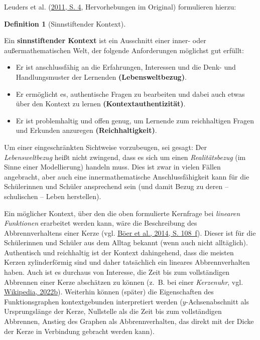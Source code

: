 \documentclass[
]{scrbook}
\providecommand{\tightlist}{%
  \setlength{\itemsep}{0pt}\setlength{\parskip}{0pt}}
\theoremstyle{definition}
\newtheorem{definition}{Definition}[chapter]
\theoremstyle{definition}
\theoremstyle{definition}
\theoremstyle{definition}
\theoremstyle{remark}
\begin{document}
Leuders et al. (\protect\hyperlink{ref-Leuders2011}{2011, S. 4}, Hervorhebungen im Original) formulieren hierzu:

\begin{definition}[Sinnstiftender Kontext]
\protect\hypertarget{def:Kontext}{}\label{def:Kontext}

Ein \textbf{sinnstiftender Kontext} ist ein Ausschnitt einer inner- oder außermathematischen Welt, der folgende Anforderungen möglichst gut erfüllt:

\begin{itemize}
\tightlist
\item
  Er ist anschlussfähig an die Erfahrungen, Interessen und die Denk- und Handlungsmuster der Lernenden \textbf{(Lebensweltbezug)}.
\item
  Er ermöglicht es, authentische Fragen zu bearbeiten und dabei auch etwas über den Kontext zu lernen \textbf{(Kontextauthentizität)}.
\item
  Er ist problemhaltig und offen genug, um Lernende zum reichhaltigen Fragen und Erkunden anzuregen \textbf{(Reichhaltigkeit)}.
\end{itemize}

\end{definition}

Um einer eingeschränkten Sichtweise vorzubeugen, sei gesagt: Der \emph{Lebensweltbezug} heißt nicht zwingend, dass es sich um einen \emph{Realitätsbezug} (im Sinne einer Modellierung) handeln muss. Dies ist zwar in vielen Fällen angebracht, aber auch eine innermathematische Anschlussfähigkeit kann für die Schülerinnen und Schüler ansprechend sein (und damit Bezug zu deren -- schulischen -- Leben herstellen).

Ein möglicher Kontext, über den die oben formulierte Kernfrage bei \emph{linearen Funktionen} erarbeitet werden kann, wäre die Beschreibung des Abbrennverhaltens einer Kerze (vgl. \protect\hyperlink{ref-Boeer2014}{Böer et al., 2014, S. 108~f}). Dieser ist für die Schülerinnen und Schüler aus dem Alltag bekannt (wenn auch nicht alltäglich). Authentisch und reichhaltig ist der Kontext dahingehend, dass die meisten Kerzen zylinderförmig sind und daher tatsächlich ein lineares Abbrennverhalten haben. Auch ist es durchaus von Interesse, die Zeit bis zum vollständigen Abbrennen einer Kerze abschätzen zu können (z.~B. bei einer \emph{Kerzenuhr}, vgl. \protect\hyperlink{ref-WikiKerze}{Wikipedia, 2022b}). Weiterhin können (später) die Eigenschaften des Funktionsgraphen kontextgebunden interpretiert werden (\(y\)-Achsenabschnitt als Ursprungslänge der Kerze, Nullstelle als die Zeit bis zum vollständigen Abbrennen, Anstieg des Graphen als Abbrennverhalten, das direkt mit der Dicke der Kerze in Verbindung gebracht werden kann).
\end{document}
